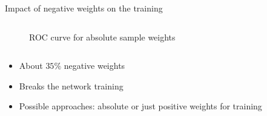 \begin{frame}{Impact of negative weights on the training}
\begin{columns}
\begin{column}{0.5\textwidth}
\begin{figure}
                \caption{ROC curve for absolute sample weights}
            \end{figure}
        \end{column}
    \end{columns}
    \begin{itemize}
        \item About $35 \%$ negative weights
        \item Breaks the network training
        \item Possible approaches: absolute or just positive weights for training
    \end{itemize}
\end{frame}
